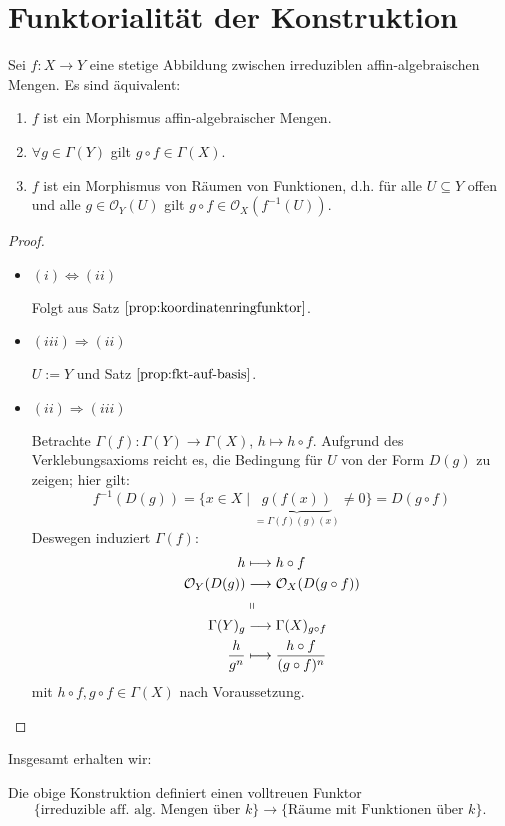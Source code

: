 
\section{Funktorialität der Konstruktion}
\label{sec:funktorialitaet-affine-varietaet}
\begin{prop}[orig. 35]
  \label{prop:charakterisierung-morphismen-alg-mengen}
  Sei $f:X\rightarrow Y$ eine stetige Abbildung zwischen irreduziblen
  affin-algebraischen Mengen. Es sind äquivalent:
  \begin{enumerate}
  \item $f$ ist ein Morphismus affin-algebraischer Mengen.
  \item $\forall g\in\Gamma(Y)$ gilt $g\circ f\in\Gamma(X)$.
  \item $f$ ist ein Morphismus von Räumen von Funktionen, d.h. für alle $U\subseteq Y$
    offen und alle $g\in\mathcal{O}_{Y}(U)$ gilt $g\circ f\in\mathcal{O}_{X}(f^{-1}(U))$.
  \end{enumerate}
\end{prop}
\begin{proof}
  \mbox{}
  \begin{itemize}
  \item $(i)\Leftrightarrow(ii)$ 

    Folgt aus Satz $\ref{prop:koordinatenringfunktor}$.
  \item $(iii)\Rightarrow(ii)$ 

    $U:=Y$ und Satz $\ref{prop:fkt-auf-basis}$.
  \item $(ii)\Rightarrow(iii)$

    Betrachte $\Gamma(f):\Gamma(Y)\rightarrow\Gamma(X)$, $h\mapsto h\circ f$.
    Aufgrund des Verklebungsaxioms reicht es, die Bedingung für $U$ von
    der Form $D(g)$ zu zeigen; hier gilt:
    \[
      f^{-1}(D(g))=\{x\in X\mid\underbrace{g(f(x))}_{=\Gamma(f)(g)(x)}\neq0\}=D(g \circ f)
    \]
    Deswegen induziert $\Gamma(f)$:
    \begin{align*}
      h & \longmapsto h\circ f\\
      \mathcal{O}_{Y}(D(g)) & \longrightarrow\mathcal{O}_{X}(D(g\circ f))\\
        & \shortparallel\\
      \Gamma(Y)_{g} & \longrightarrow\Gamma(X)_{g \circ f}\\
      \frac{h}{g^{n}} & \longmapsto\frac{h\circ f}{(g\circ f)^{n}}
    \end{align*}
    mit $h\circ f, g\circ f\in\Gamma(X)$ nach Voraussetzung.

  \end{itemize}
\end{proof}
Insgesamt erhalten wir:
\begin{thm}[orig. 36]
  \label{thm:aequivalenz-alg-mengen-aff-varietaeten}
  Die obige Konstruktion definiert einen volltreuen Funktor
  \[
    \text{\{irreduzible aff. alg. Mengen über }k\}\rightarrow\{\text{Räume mit Funktionen über }k\}.
  \]
\end{thm}

